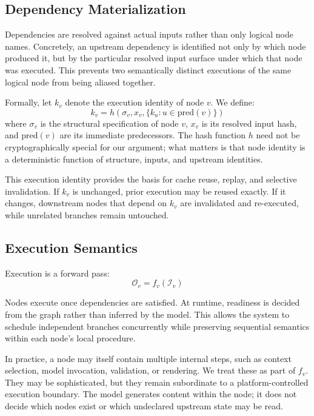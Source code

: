 \documentclass{article}
\begin{document}
\subsection{Dependency Materialization}

Dependencies are resolved against actual inputs rather than only logical node names. Concretely, an upstream dependency is identified not only by which node produced it, but by the particular resolved input surface under which that node was executed. This prevents two semantically distinct executions of the same logical node from being aliased together.

Formally, let $k_v$ denote the execution identity of node $v$. We define:
\begin{equation}
k_v = h(\sigma_v, x_v, \{k_u : u \in \mathrm{pred}(v)\})
\end{equation}
where $\sigma_v$ is the structural specification of node $v$, $x_v$ is its resolved input hash, and $\mathrm{pred}(v)$ are its immediate predecessors. The hash function $h$ need not be cryptographically special for our argument; what matters is that node identity is a deterministic function of structure, inputs, and upstream identities.

This execution identity provides the basis for cache reuse, replay, and selective invalidation. If $k_v$ is unchanged, prior execution may be reused exactly. If it changes, downstream nodes that depend on $k_v$ are invalidated and re-executed, while unrelated branches remain untouched.

\subsection{Execution Semantics}

Execution is a forward pass:
\begin{equation}
\mathcal{O}_v = f_v(\mathcal{I}_v)
\end{equation}

Nodes execute once dependencies are satisfied. At runtime, readiness is decided from the graph rather than inferred by the model. This allows the system to schedule independent branches concurrently while preserving sequential semantics within each node's local procedure.

In practice, a node may itself contain multiple internal steps, such as context selection, model invocation, validation, or rendering. We treat these as part of $f_v$. They may be sophisticated, but they remain subordinate to a platform-controlled execution boundary. The model generates content within the node; it does not decide which nodes exist or which undeclared upstream state may be read.
\end{document}
